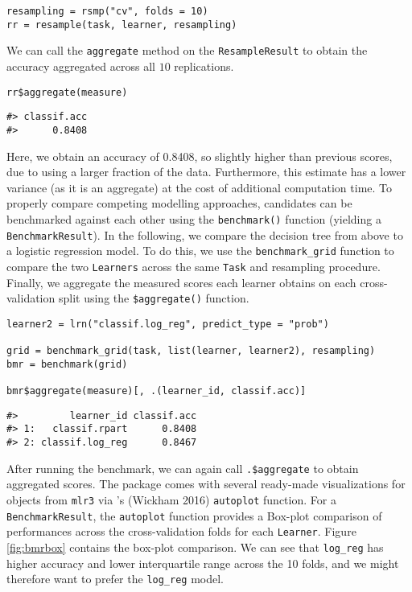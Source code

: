 \begin{verbatim}
resampling = rsmp("cv", folds = 10)
rr = resample(task, learner, resampling)
\end{verbatim}

We can call the \texttt{aggregate} method on the \texttt{ResampleResult} to obtain the accuracy aggregated across all \(10\) replications.

\begin{verbatim}
rr$aggregate(measure)
\end{verbatim}

\begin{verbatim}
#> classif.acc 
#>      0.8408
\end{verbatim}

Here, we obtain an accuracy of 0.8408, so slightly higher than previous scores, due to using a larger fraction of the data.
Furthermore, this estimate has a lower variance (as it is an aggregate) at the cost of additional computation time.
To properly compare competing modelling approaches, candidates can be benchmarked against each other using the \texttt{benchmark()} function (yielding a \texttt{BenchmarkResult}).
In the following, we compare the decision tree from above to a logistic regression model.
To do this, we use the \texttt{benchmark\_grid} function to compare the two \texttt{Learners} across the same \texttt{Task} and resampling procedure.
Finally, we aggregate the measured scores each learner obtains on each cross-validation split using the \texttt{\$aggregate()} function.

\begin{verbatim}
learner2 = lrn("classif.log_reg", predict_type = "prob")

grid = benchmark_grid(task, list(learner, learner2), resampling)
bmr = benchmark(grid)

bmr$aggregate(measure)[, .(learner_id, classif.acc)]
\end{verbatim}

\begin{verbatim}
#>         learner_id classif.acc
#> 1:   classif.rpart      0.8408
#> 2: classif.log_reg      0.8467
\end{verbatim}

After running the benchmark, we can again call \texttt{.\$aggregate} to obtain aggregated scores.
The  package comes with several ready-made visualizations for objects from \texttt{mlr3} via 's (Wickham 2016) \texttt{autoplot} function.
For a \texttt{BenchmarkResult}, the \texttt{autoplot} function provides a Box-plot comparison of performances across the cross-validation folds for each \texttt{Learner}.
Figure \ref{fig:bmrbox} contains the box-plot comparison.
We can see that \texttt{log\_reg} has higher accuracy and lower interquartile range across the 10 folds, and we might therefore want to prefer the \texttt{log\_reg} model.


